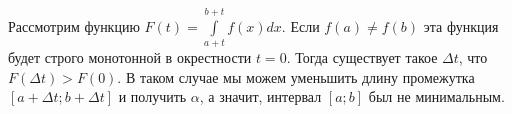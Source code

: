 \documentclass{article}
\begin{document}
Рассмотрим функцию $F(t) = \int\limits_{a+t}^{b+t} f(x) dx$. Если $f(a) \neq f(b)$ эта функция будет строго монотонной в окрестности $t=0$. Тогда существует такое $\Delta t$, что $F(\Delta t) > F(0)$. В таком случае мы можем уменьшить длину промежутка $[a+\Delta t; b + \Delta t]$ и получить $\alpha$, а значит, интервал $[a;b]$ был не минимальным.
\end{document}
